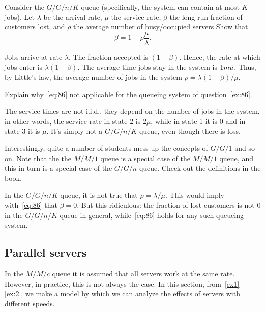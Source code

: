 \begin{exercise}[201807]
 Consider the $G/G/n/K$ queue (specifically, the system can contain at most $K$ jobs).
 Let $\lambda$ be the arrival rate, $\mu$ the service rate, $\beta$ the long-run fraction of customers lost, and $\rho$ the average number of busy/occupied servers Show that
 \begin{equation}\label{eq:86}
 \beta = 1 - \rho\frac{\mu}{\lambda}.
 \end{equation}
\begin{solution}
 Jobs arrive at rate $\lambda$.
 The fraction accepted is $(1-\beta)$.
 Hence, the rate at which jobs enter is $\lambda(1-\beta)$. The average time jobs stay in the system is $1\\mu$. Thus, by Little's law, the average number of jobs in the system $\rho=\lambda(1-\beta)/\mu$. 
\end{solution}
\end{exercise}


\begin{exercise}[201807]
 Explain why~\cref{eq:86} not applicable for the queueing system of question~\cref{ex:86}.
\begin{solution}
 The service times are not i.i.d., they depend on the number of jobs in the system, in other words, the service rate in state 2 is $2\mu$, while in state 1 it is 0 and in state 3 it is $\mu$. It's simply not a $G/G/n/K$ queue, even though there is loss. 


Interestingly, quite a number of students mess up the concepts of $G/G/1$ and so on. Note that the the $M/M/1$ queue is a special case of the $M/M/1$ queue, and this in turn is a special case of the $G/G/n$ queue. Check out the definitions in the book.

In the $G/G/n/K$ queue, it is not true that $\rho=\lambda/\mu$. This would imply with~\cref{eq:86} that $\beta=0$. But this ridiculous: the fraction of lost customers is not 0 in the $G/G/n/K$ queue in general, while~\cref{eq:86} holds for any such queueing system. 
\end{solution}
\end{exercise}

\subsection{Parallel servers}
\label{sec:parallel-servers}

In the $M/M/c$ queue it is assumed that all servers work at the same rate.
However, in practice, this is not always the case.
In this section, from~\cref{ex1}--\cref{ex:2}, we make a model by which we can analyze the effects of servers with different speeds.

